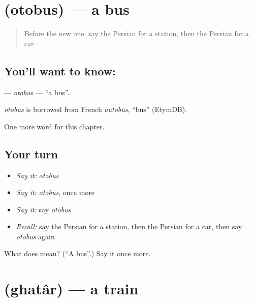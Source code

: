 \section[\texorpdfstring{\fa{اتوبوس} (otobus)}{اتوبوس (otobus)}]{ (otobus) — a bus}

\label{lesson:FA-C70-otobus}



\begin{quote}
Before the new one: say the Persian for a station, then the Persian for a car.
\end{quote}

\subsection*{You'll want to know: }
\textbf{} — \emph{otobus} — \textquotedblleft{}a bus\textquotedblright{}.

\begin{cousinweb}
\emph{otobus} is borrowed from French \emph{autobus}, \textquotedblleft{}bus\textquotedblright{} (EtymDB).
\end{cousinweb}

\begin{grammarlens}[title={What you've built}]
One more word for this chapter.
\end{grammarlens}

\subsection*{Your turn}
\begin{itemize}
\raggedright
  \item \emph{Say it:} \emph{otobus}
  \item \emph{Say it:} \emph{otobus}, once more
  \item \emph{Say it:} say \emph{otobus}
  \item \emph{Recall:} say the Persian for a station, then the Persian for a car, then say \emph{otobus} again
\end{itemize}

\begin{tcolorbox}[breakable,colback=teal!4,colframe=teal!35!black,title={Before you move on}]
What does  mean? (\textquotedblleft{}A bus\textquotedblright{}.) Say it once more.
\end{tcolorbox}
\section[\texorpdfstring{\fa{قطار} (ghatâr)}{قطار (ghatâr)}]{ (ghatâr) — a train}

